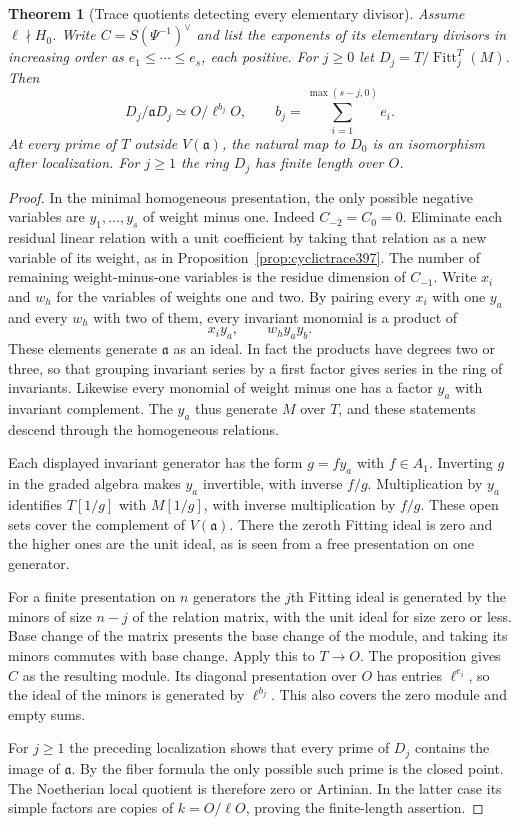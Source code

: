 \documentclass[a4paper,11pt]{article}
\newtheorem{theorem}[proposition]{Theorem}
\theoremstyle{definition}
\theoremstyle{remark}
\numberwithin{equation}{section}
\begin{document}
\begin{theorem}[Trace quotients detecting every elementary divisor]\leavevmode
\label{thm:negfit398}
Assume \(\ell\nmid H_0\). Write \(C=S(\Psi^{-1})^\vee\) and
list the exponents of its elementary divisors in increasing
order as \(e_1\le\cdots\le e_s\), each positive. For \(j\ge0\) let
\(D_j=T/\operatorname{Fitt}_j^T(M)\). Then
\[
  D_j/\mathfrak aD_j \simeq O/\ell^{b_j}O,\qquad
  b_j=\sum_{i=1}^{\max(s-j,0)}e_i .
\]
At every prime of \(T\) outside \(V(\mathfrak a)\), the natural
map to \(D_0\) is an isomorphism after localization. For
\(j\ge1\) the ring \(D_j\) has finite length over \(O\).
\end{theorem}
\begin{proof}
In the minimal homogeneous presentation, the only possible
negative variables are \(y_1,\ldots,y_s\) of weight minus one.
Indeed \(C_{-2}=C_0=0\). Eliminate each residual linear relation
with a unit coefficient by taking that relation as a new variable
of its weight, as in Proposition~\ref{prop:cyclictrace397}.
The number of remaining weight-minus-one variables is the residue
dimension of \(C_{-1}\). Write \(x_i\) and \(w_h\) for the variables
of weights one and two. By pairing every \(x_i\) with one \(y_a\)
and every \(w_h\) with two of them, every invariant monomial is a
product of
\[
                 x_i y_a,\qquad w_h y_a y_b .
\]
These elements generate \(\mathfrak a\) as an ideal. In fact the
products have degrees two or three, so that grouping invariant
series by a first factor gives series in the ring of invariants.
Likewise every monomial of weight minus one has a factor \(y_a\)
with invariant complement. The \(y_a\) thus generate \(M\) over
\(T\), and these statements descend through the homogeneous relations.

Each displayed invariant generator has the form \(g=f y_a\)
with \(f\in A_1\). Inverting \(g\) in the graded algebra makes
\(y_a\) invertible, with inverse \(f/g\). Multiplication by
\(y_a\) identifies \(T[1/g]\) with \(M[1/g]\), with inverse
multiplication by \(f/g\). These open sets cover the complement
of \(V(\mathfrak a)\). There the zeroth Fitting ideal is zero and
the higher ones are the unit ideal, as is seen from a free
presentation on one generator.

For a finite presentation on \(n\) generators the \(j\)th Fitting
ideal is generated by the minors of size \(n-j\) of the relation
matrix, with the unit ideal for size zero or less. Base change of
the matrix presents the base change of the module, and taking its
minors commutes with base change. Apply this to \(T\to O\).
The proposition gives \(C\) as the resulting module. Its diagonal
presentation over \(O\) has entries \(\ell^{e_i}\), so the ideal
of the minors is generated by \(\ell^{b_j}\). This also covers
the zero module and empty sums.

For \(j\ge1\) the preceding localization shows that every prime
of \(D_j\) contains the image of \(\mathfrak a\). By the fiber
formula the only possible such prime is the closed point. The
Noetherian local quotient is therefore zero or Artinian. In the
latter case its simple factors are copies of \(k=O/\ell O\),
proving the finite-length assertion.
\end{proof}
\end{document}
